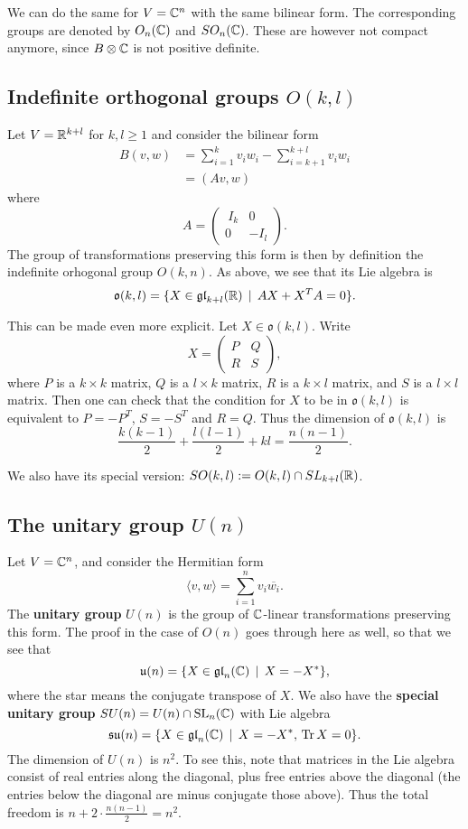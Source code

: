 \documentclass[11pt, english]{article}
\begin{document}
We can do the same for $V= \mathbb{C}^n$ with the same bilinear form. The corresponding groups are denoted by $O_n(\mathbb{C})$ and $SO_n(\mathbb{C})$. These are however not compact anymore, since $B \otimes \mathbb{C}$ is not positive definite.

\subsection{Indefinite orthogonal groups $O(k,l)$}

Let $V=\mathbb{R}^{k+l}$ for $k, l \geq 1$ and consider the bilinear form
\begin{align*}
B(v,w) &= \sum_{i=1}^k v_iw_i - \sum_{i=k+1}^{k+l} v_iw_i \\
&= (Av,w)
\end{align*}
where
$$
A = \begin{pmatrix} \
I_k &  0 \\
0 & -I_l \end{pmatrix}.
$$
The group of transformations preserving this form is then by definition the indefinite orhogonal group $O(k,n)$. As above, we see that its Lie algebra is
$$
\mathfrak{o}(k,l) = \{ X \in \mathfrak{gl}_{k+l}(\mathbb{R}) \, \mid \, AX+X^TA=0 \} . 
$$

This can be made even more explicit. Let $X \in \mathfrak{o}(k,l)$. Write
$$
X = \begin{pmatrix}
P & Q \\
R & S
\end{pmatrix},
$$
where $P$ is a $k \times k$ matrix, $Q$ is a $l \times k$ matrix, $R$ is a $k \times l$ matrix, and $S$ is a $l \times l$ matrix. Then one can check that the condition for $X$ to be in $\mathfrak{o}(k,l)$ is equivalent to $P=-P^T$, $S=-S^T$ and $R=Q$. Thus the dimension of $\mathfrak{o}(k,l)$ is
$$
\frac{k(k-1)}{2} + \frac{l(l-1)}{2} + kl = \frac{n(n-1)}{2}.
$$

We also have its special version: $SO(k,l) := O(k,l) \cap SL_{k+l}(\mathbb{R})$. 

\subsection{The unitary group $U(n)$}

Let $V=\mathbb{C}^n$, and consider the Hermitian form
$$
\langle v, w \rangle = \sum_{i=1}^n v_i \overline{w_i}.
$$
The \textbf{unitary group} $U(n)$ is the group of $\mathbb{C}$-linear transformations preserving this form. The proof in the case of $O(n)$ goes through here as well, so that we see that
$$
\mathfrak{u}(n) = \{ X \in \mathfrak{gl}_n(\mathbb{C}) \, \mid \, X = -X^\ast \},
$$
where the star means the conjugate transpose of $X$. We also have the \textbf{special unitary group} $SU(n) = U(n) \cap \operatorname{SL}_n(\mathbb{C})$ with Lie algebra
$$
\mathfrak{su}(n) = \{ X \in \mathfrak{gl}_n(\mathbb{C}) \, \mid \, X = -X^\ast, \, \operatorname{Tr} X = 0\}.
$$
The dimension of $U(n)$ is $n^2$. To see this, note that matrices in the Lie algebra consist of real entries along the diagonal, plus free entries above the diagonal (the entries below the diagonal are minus conjugate those above). Thus the total freedom is $n+2 \cdot \frac{n(n-1)}{2} = n^2$.
\end{document}
